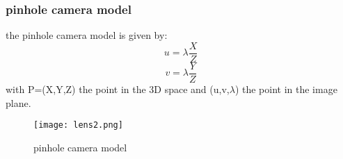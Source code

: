 \documentclass[a4paper,12pt]{article}
\begin{document}
\subsubsection{pinhole camera model}
the pinhole camera model is given by:
\begin{equation}
    u=\lambda \frac{X}{Z}
\end{equation}
\begin{equation}
    v=\lambda \frac{Y}{Z}
\end{equation}
with P=(X,Y,Z) the point in the 3D 
space and (u,v,$\lambda$) the point in the image plane.\\
\begin{figure}
    \centering
    \texttt{[image: lens2.png]}
    \caption{pinhole camera model}
    \label{fig:pinhole camera model}
\end{figure}
\end{document}
